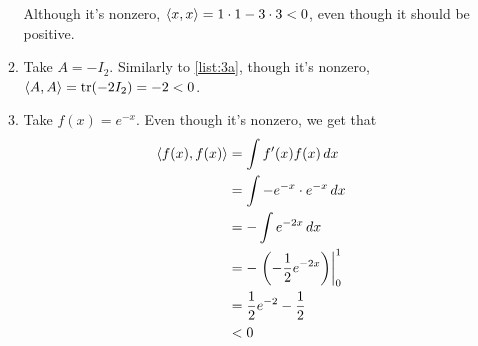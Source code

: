 \documentclass[12pt]{article}
\begin{document}
\begin{enumerate}
\begin{enumerate}
                        Although it's nonzero, $\braket{x, x}=1 \cdot 1 - 3 \cdot 3 < 0$, even though it should be positive. \label{list:3a}
                  \item Take $A=-I_2$.
                        Similarly to \ref{list:3a}, though it's nonzero, $\braket{A, A}=\text{tr}(-2I_2)=-2 < 0$.
                  \item Take $f(x)=e^{-x}$.
                        Even though it's nonzero, we get that
                        \begin{align*}
                              \braket{f(x), f(x)} & = \int f'(x)f(x)\,dx                                \\
                                                  & = \int -e^{-x} \cdot e^{-x}\,dx                     \\
                                                  & =-\int e^{-2x}\,dx                                  \\
                                                  & =-\left.\left(-\frac{1}{2}e^{-2x}\right)\right|^1_0 \\
                                                  & =\frac{1}{2}e^{-2}-\frac{1}{2}                      \\
                                                  & < 0
                        \end{align*}


\end{enumerate}
\end{enumerate}
\end{document}
